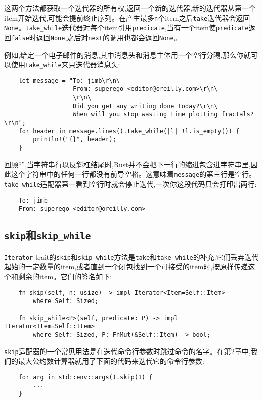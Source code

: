 这两个方法都获取一个迭代器的所有权,返回一个新的迭代器,新的迭代器从第一个item开始迭代,可能会提前终止序列。在产生最多\texttt{n}个item之后\texttt{take}迭代器会返回\texttt{None}。\texttt{take\_while}迭代器对每个item引用\texttt{predicate},当有一个item使\texttt{predicate}返回\texttt{false}时返回\texttt{None},之后对\texttt{next}的调用也都会返回\texttt{None}。

例如,给定一个电子邮件的消息,其中消息头和消息主体用一个空行分隔,那么你就可以使用\texttt{take\_while}来只迭代器消息头:
\begin{verbatim}
    let message = "To: jimb\r\n\
                   From: superego <editor@oreilly.com>\r\n\
                   \r\n\
                   Did you get any writing done today?\r\n\
                   When will you stop wasting time plotting fractals?\r\n";
    for header in message.lines().take_while(|l| !l.is_empty()) {
        println!("{}", header);
    }
\end{verbatim}

回顾“”,当字符串行以反斜杠结尾时,Rust并不会把下一行的缩进包含进字符串里,因此这个字符串中的任何一行都没有前导空格。这意味着\texttt{message}的第三行是空行。\texttt{take\_while}适配器第一看到空行时就会停止迭代,一次你这段代码只会打印出两行:
\begin{verbatim}
    To: jimb
    From: superego <editor@oreilly.com>
\end{verbatim}

\subsection{\texttt{skip}和\texttt{skip\_while}}
\texttt{Iterator} trait的\texttt{skip}和\texttt{skip\_while}方法是\texttt{take}和\texttt{take\_while}的补充:它们丢弃迭代起始的一定数量的item,或者直到一个闭包找到一个可接受的item时,按原样传递这个和剩余的item。它们的签名如下:
\begin{verbatim}
    fn skip(self, n: usize) -> impl Iterator<Item=Self::Item>
        where Self: Sized;

    fn skip_while<P>(self, predicate: P) -> impl Iterator<Item=Self::Item>
        where Self: Sized, P: FnMut(&Self::Item) -> bool;
\end{verbatim}

\texttt{skip}适配器的一个常见用法是在迭代命令行参数时跳过命令的名字。在\hyperref[ch02]{第2章}中,我们的最大公约数计算器就用了下面的代码来迭代它的命令行参数:
\begin{verbatim}
    for arg in std::env::args().skip(1) {
        ...
    }
\end{verbatim}

